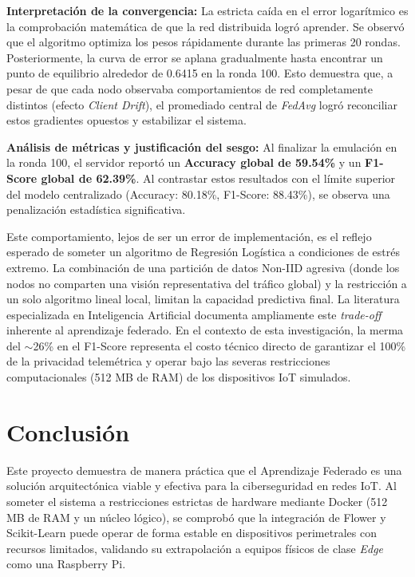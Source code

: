 \documentclass[12pt,a4paper]{article}
\begin{document}
\textbf{Interpretación de la convergencia:} La estricta caída en el error logarítmico es la comprobación matemática de que la red distribuida logró aprender. Se observó que el algoritmo optimiza los pesos rápidamente durante las primeras 20 rondas. Posteriormente, la curva de error se aplana gradualmente hasta encontrar un punto de equilibrio alrededor de 0.6415 en la ronda 100. Esto demuestra que, a pesar de que cada nodo observaba comportamientos de red completamente distintos (efecto \textit{Client Drift}), el promediado central de \textit{FedAvg} logró reconciliar estos gradientes opuestos y estabilizar el sistema.

\textbf{Análisis de métricas y justificación del sesgo:}
Al finalizar la emulación en la ronda 100, el servidor reportó un \textbf{Accuracy global de 59.54\%} y un \textbf{F1-Score global de 62.39\%}. Al contrastar estos resultados con el límite superior del modelo centralizado (Accuracy: 80.18\%, F1-Score: 88.43\%), se observa una penalización estadística significativa. 

Este comportamiento, lejos de ser un error de implementación, es el reflejo esperado de someter un algoritmo de Regresión Logística a condiciones de estrés extremo. La combinación de una partición de datos Non-IID agresiva (donde los nodos no comparten una visión representativa del tráfico global) y la restricción a un solo algoritmo lineal local, limitan la capacidad predictiva final. La literatura especializada en Inteligencia Artificial \cite{zhao2018} documenta ampliamente este \textit{trade-off} inherente al aprendizaje federado. En el contexto de esta investigación, la merma del $\sim$26\% en el F1-Score representa el costo técnico directo de garantizar el 100\% de la privacidad telemétrica y operar bajo las severas restricciones computacionales (512 MB de RAM) de los dispositivos IoT simulados.


\section{Conclusión}

Este proyecto demuestra de manera práctica que el Aprendizaje Federado es una solución arquitectónica viable y efectiva para la ciberseguridad en redes IoT. Al someter el sistema a restricciones estrictas de hardware mediante Docker (512 MB de RAM y un núcleo lógico), se comprobó que la integración de Flower y Scikit-Learn puede operar de forma estable en dispositivos perimetrales con recursos limitados, validando su extrapolación a equipos físicos de clase \textit{Edge} como una Raspberry Pi.
\end{document}
